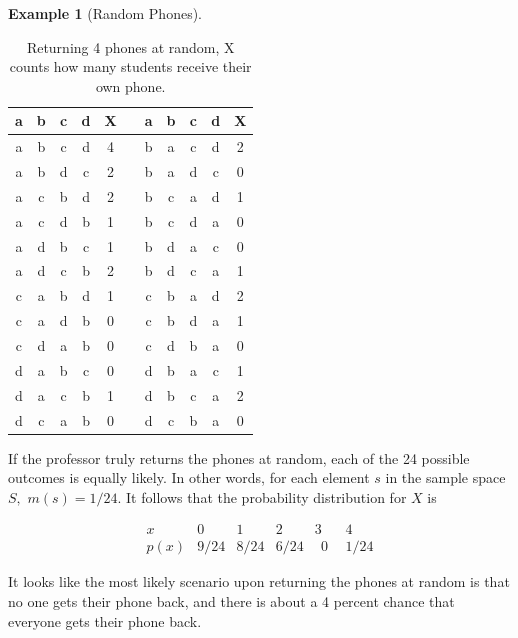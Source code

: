 \documentclass[
]{book}
\theoremstyle{definition}
\theoremstyle{definition}
\newtheorem{example}{Example}[chapter]
\theoremstyle{definition}
\theoremstyle{definition}
\theoremstyle{remark}
\begin{document}
\begin{example}[Random Phones]
\begin{table}[!h]
\centering\centering
\caption{\label{tab:phone-table}Returning 4 phones at random, X counts how many students receive their own phone.}
\centering
\begin{tabular}[t]{|>{}c|c|c|>{}c||>{}c||>{}c||c|c|c|>{}c||>{}c|}
\hline
\textbf{a} & \textbf{b} & \textbf{c} & \textbf{d} & \textbf{X} & \textbf{ } & \textbf{a} & \textbf{b} & \textbf{c} & \textbf{d} & \textbf{X}\\
\hline
a & b & c & d & 4 &  & b & a & c & d & 2\\
\hline
a & b & d & c & 2 &  & b & a & d & c & 0\\
\hline
a & c & b & d & 2 &  & b & c & a & d & 1\\
\hline
a & c & d & b & 1 &  & b & c & d & a & 0\\
\hline
a & d & b & c & 1 &  & b & d & a & c & 0\\
\hline
a & d & c & b & 2 &  & b & d & c & a & 1\\
\hline
c & a & b & d & 1 &  & c & b & a & d & 2\\
\hline
c & a & d & b & 0 &  & c & b & d & a & 1\\
\hline
c & d & a & b & 0 &  & c & d & b & a & 0\\
\hline
d & a & b & c & 0 &  & d & b & a & c & 1\\
\hline
d & a & c & b & 1 &  & d & b & c & a & 2\\
\hline
d & c & a & b & 0 &  & d & c & b & a & 0\\
\hline
\end{tabular}
\end{table}

If the professor truly returns the phones at random, each of the 24 possible outcomes is equally likely. In other words, for each element \(s\) in the sample space \(S,\) \(m(s) = 1/24\). It follows that the probability distribution for \(X\) is

\[
\begin{array}{c|c|c|c|c|c}
x & 0 & 1 & 2 & 3 & 4\\ \hline
p(x) & 9/24 & 8/24 & 6/24 & ~~0~~ & 1/24  
\end{array}
\]

It looks like the most likely scenario upon returning the phones at random is that no one gets their phone back, and there is about a 4 percent chance that everyone gets their phone back.

\end{example}
\end{document}
